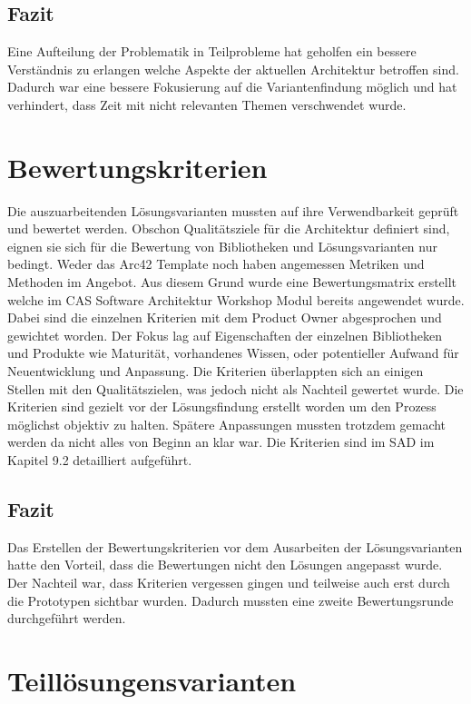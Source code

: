 \subsection{Fazit}

Eine Aufteilung der Problematik in Teilprobleme hat geholfen ein bessere Verständnis zu erlangen welche Aspekte der aktuellen Architektur betroffen sind. Dadurch war eine bessere Fokusierung auf die Variantenfindung möglich und hat verhindert, dass Zeit mit nicht relevanten Themen verschwendet wurde.

\section{Bewertungskriterien}

Die auszuarbeitenden Lösungsvarianten mussten auf ihre Verwendbarkeit geprüft und bewertet werden. Obschon Qualitätsziele für die Architektur definiert sind, eignen sie sich für die Bewertung von Bibliotheken und Lösungsvarianten nur bedingt. Weder das Arc42 Template noch \cite{esa} haben angemessen Metriken und Methoden im Angebot. Aus diesem Grund wurde eine Bewertungsmatrix erstellt welche im CAS Software Architektur Workshop Modul bereits angewendet wurde. Dabei sind die einzelnen Kriterien mit dem Product Owner abgesprochen und gewichtet worden. Der Fokus lag auf Eigenschaften der einzelnen Bibliotheken und Produkte wie Maturität, vorhandenes Wissen, oder potentieller Aufwand für Neuentwicklung und Anpassung. Die Kriterien überlappten sich an einigen Stellen mit den Qualitätszielen, was jedoch nicht als Nachteil gewertet wurde. Die Kriterien sind gezielt vor der Lösungsfindung erstellt worden um den Prozess möglichst objektiv zu halten. Spätere Anpassungen mussten trotzdem gemacht werden da nicht alles von Beginn an klar war. Die Kriterien sind im SAD im Kapitel 9.2 detailliert aufgeführt.

\subsection{Fazit}

Das Erstellen der Bewertungskriterien vor dem Ausarbeiten der Lösungsvarianten hatte den Vorteil, dass die Bewertungen nicht den Lösungen angepasst wurde. Der Nachteil war, dass Kriterien vergessen gingen und teilweise auch erst durch die Prototypen sichtbar wurden. Dadurch mussten eine zweite Bewertungsrunde durchgeführt werden.


\section{Teillösungensvarianten}

